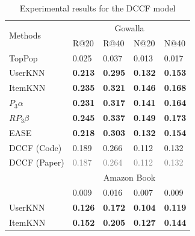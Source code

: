 \documentclass[sigconf,natbib=true,nonacm]{acmart}
\begin{document}
\begin{table}[htbp]
    \caption{Experimental results for the DCCF model}
    \label{tab:dccf}
    \centering
    \begin{tabular}{l l l l l }
        \multirow{2}{*}{Methods} & \multicolumn{4}{c}{Gowalla} \\
        ~                        & R@20               & R@40                    & N@20               & N@40       \\ \hline
        TopPop               & 0.025                & 0.037                     & 0.013                 & 0.017         \\
        UserKNN                  & \textbf{0.213}       & \textbf{0.295}            & \textbf{0.132}        & \textbf{0.153} \\
        ItemKNN                  & \textbf{0.235}       & \textbf{0.321}            & \textbf{0.146}        & \textbf{0.168} \\
        $P_{3}\alpha$            & \textbf{0.231}       & \textbf{0.317}            & \textbf{0.141}        & \textbf{0.164}   \\
        $RP_{3}\beta$            &  \textbf{0.245}      &  \textbf{0.337}           & \textbf{0.149}        & \textbf{0.173}     \\
        EASE                     &  \textbf{0.218}      &  \textbf{0.303}           & \textbf{0.132}        & \textbf{0.154}      \\
        DCCF  (Code)                   & 0.189	            & 0.266	                    &   0.112	            &  0.132               \\
        DCCF (Paper)             & \textcolor{gray}{0.187}	            & \textcolor{gray}{0.264}	                    &   \textcolor{gray}{0.112}	            & \textcolor{gray}{0.132}              \vspace{5pt} \\
        \multirow{2}{*}{} & \multicolumn{4}{c}{Amazon Book} \\ \hline
        TopPop              & 0.009                &   0.016                   & 0.007                 & 0.009             \\
        UserKNN                 & \textbf{0.126}       & \textbf{0.172}            & \textbf{0.104}        & \textbf{0.119}            \\
        ItemKNN                 & \textbf{0.152}       & \textbf{0.205}            & \textbf{0.127}        &  \textbf{0.144}           \\

\end{tabular}
\end{table}
\end{document}
